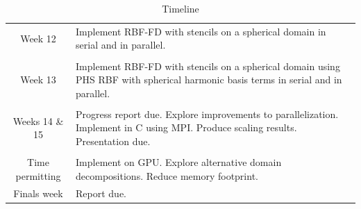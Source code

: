 \documentclass[12pt]{article}
\begin{document}
	\begin{table}
		\caption{Timeline}
		\begin{tabular}{ c| p{12cm}} 
			Week 12 & Implement RBF-FD with stencils on a spherical domain in serial and in parallel.\\
			& \\
			Week 13 & Implement RBF-FD with stencils on a spherical domain using PHS RBF with spherical harmonic basis terms in serial and in parallel. \\
			&\\
			Weeks 14 \& 15 & Progress report due. Explore improvements to parallelization. Implement in C using MPI. Produce scaling results. Presentation due.\\
			&\\
			Time permitting &  Implement on GPU. Explore alternative domain decompositions. Reduce memory footprint.\\
			Finals week & Report due.
			
		\end{tabular}
		
	\end{table}
 
\pagebreak
 
\printbibliography
\end{document}

